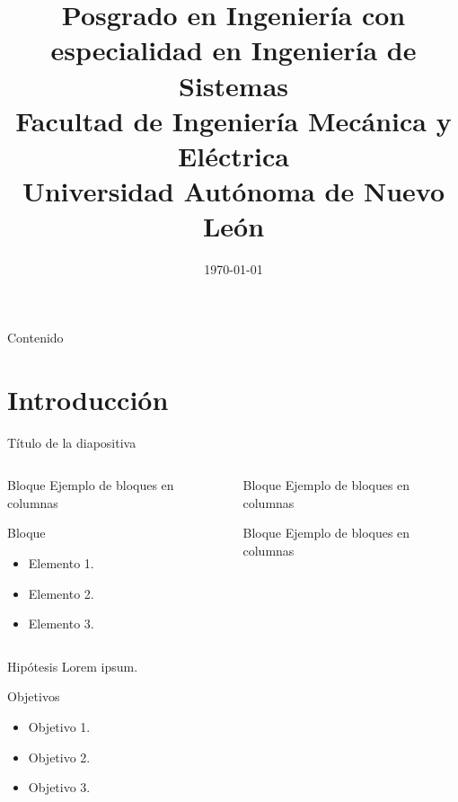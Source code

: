 \documentclass[9pt]{beamer}
\title[Título}
\author{{\bf Nombres Apellidos}}
\institute[PISIS FIME UANL]{\sc Posgrado en Ingeniería con especialidad en Ingeniería de Sistemas \\
Facultad de Ingeniería Mecánica y Eléctrica\\
Universidad Autónoma de Nuevo León}
\date{\today}
\begin{document}
\frame
\titlepage

\begin{frame}{Contenido}
	\tableofcontents
\end{frame}


\section{Introducción}
\begin{frame}{Título de la diapositiva}
	\begin{columns}
		\begin{column}{0.45\textwidth}
			\begin{block}{Bloque}
				Ejemplo de bloques en columnas
			\end{block}

			\begin{block}{Bloque}
				\begin{itemize}
					\item Elemento 1.
					\item Elemento 2.
					\item Elemento 3.
				\end{itemize}
			\end{block}
			
		\end{column}
		\begin{column}{0.45\textwidth}
			\begin{block}{Bloque}
				Ejemplo de bloques en columnas
			\end{block}

			\begin{block}{Bloque}
				Ejemplo de bloques en columnas
			\end{block}
		\end{column}
	\end{columns}
\end{frame}

\begin{frame}{Hipótesis}
	Lorem ipsum.
\end{frame}

\begin{frame}{Objetivos}
	\begin{itemize}
		\item Objetivo 1.
		\item Objetivo 2.
		\item Objetivo 3.
	\end{itemize}
\end{frame}
\end{document}
